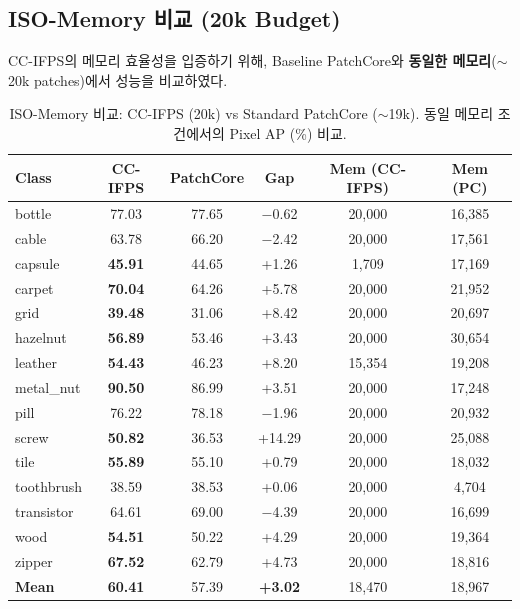 \documentclass[11pt,a4paper]{article}
\newcommand{\best}[1]{\textcolor{bestcolor}{\textbf{#1}}}
\begin{document}
\subsection{ISO-Memory 비교 (20k Budget)}

CC-IFPS의 메모리 효율성을 입증하기 위해, Baseline PatchCore와 \textbf{동일한 메모리}($\sim$20k patches)에서 성능을 비교하였다.

\begin{table}[H]
\centering
\caption{ISO-Memory 비교: CC-IFPS (20k) vs Standard PatchCore ($\sim$19k). 동일 메모리 조건에서의 Pixel AP (\%) 비교.}
\label{tab:iso_memory}
\small
\begin{tabular}{l cc c cc}
\toprule
\textbf{Class} & \textbf{CC-IFPS} & \textbf{PatchCore} & \textbf{Gap} & \textbf{Mem (CC-IFPS)} & \textbf{Mem (PC)} \\
\midrule
bottle       & 77.03 & 77.65 & $-$0.62 & 20,000 & 16,385 \\
cable        & 63.78 & 66.20 & $-$2.42 & 20,000 & 17,561 \\
capsule      & \best{45.91} & 44.65 & +1.26 & 1,709 & 17,169 \\
carpet       & \best{70.04} & 64.26 & +5.78 & 20,000 & 21,952 \\
grid         & \best{39.48} & 31.06 & +8.42 & 20,000 & 20,697 \\
hazelnut     & \best{56.89} & 53.46 & +3.43 & 20,000 & 30,654 \\
leather      & \best{54.43} & 46.23 & +8.20 & 15,354 & 19,208 \\
metal\_nut   & \best{90.50} & 86.99 & +3.51 & 20,000 & 17,248 \\
pill         & 76.22 & 78.18 & $-$1.96 & 20,000 & 20,932 \\
screw        & \best{50.82} & 36.53 & +14.29 & 20,000 & 25,088 \\
tile         & \best{55.89} & 55.10 & +0.79 & 20,000 & 18,032 \\
toothbrush   & 38.59 & 38.53 & +0.06 & 20,000 & 4,704 \\
transistor   & 64.61 & 69.00 & $-$4.39 & 20,000 & 16,699 \\
wood         & \best{54.51} & 50.22 & +4.29 & 20,000 & 19,364 \\
zipper       & \best{67.52} & 62.79 & +4.73 & 20,000 & 18,816 \\
\midrule
\rowcolor{hlrow}
\textbf{Mean} & \best{60.41} & 57.39 & \textbf{+3.02} & 18,470 & 18,967 \\
\bottomrule
\end{tabular}
\end{table}
\end{document}
